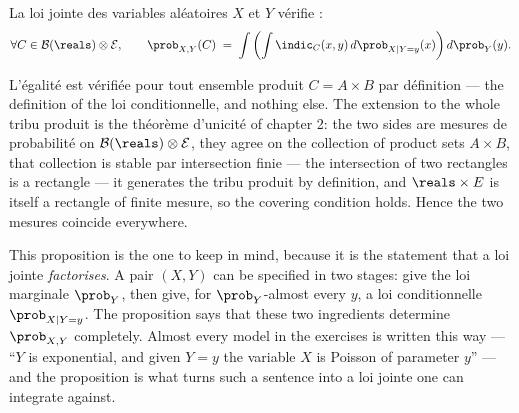 \begin{prop}
  La loi jointe des variables aléatoires $X$ et $Y$ vérifie :
  \[
    \forall C \in \mathcal{B}(\reals) \otimes \mathcal{E}, \qquad
    \prob_{X,Y}(C) \;=\; \int \left( \int \indic_{C}(x,y) \, d\prob_{X \mid Y = y}(x) \right) d\prob_{Y}(y) .
  \]
\end{prop}

L'égalité est vérifiée pour tout ensemble produit $C = A \times B$ par définition
--- the definition of the loi conditionnelle, and nothing else. The extension to
the whole tribu produit is the théorème d'unicité of chapter 2: the two sides are
mesures de probabilité on $\mathcal{B}(\reals) \otimes \mathcal{E}$, they agree on
the collection of product sets $A \times B$, that collection is stable par
intersection finie --- the intersection of two rectangles is a rectangle --- it
generates the tribu produit by definition, and $\reals \times E$ is itself a
rectangle of finite mesure, so the covering condition holds. Hence the two mesures
coincide everywhere.

\begin{remark}
  This proposition is the one to keep in mind, because it is the statement that
  a loi jointe \emph{factorises}. A pair $(X,Y)$ can be specified in two stages:
  give the loi marginale $\prob_{Y}$, then give, for $\prob_{Y}$-almost every $y$,
  a loi conditionnelle $\prob_{X \mid Y = y}$. The proposition says that these two
  ingredients determine $\prob_{X,Y}$ completely. Almost every model in the
  exercises is written this way --- ``$Y$ is exponential, and given $Y = y$ the
  variable $X$ is Poisson of parameter $y$'' --- and the proposition is what turns
  such a sentence into a loi jointe one can integrate against.
\end{remark}

